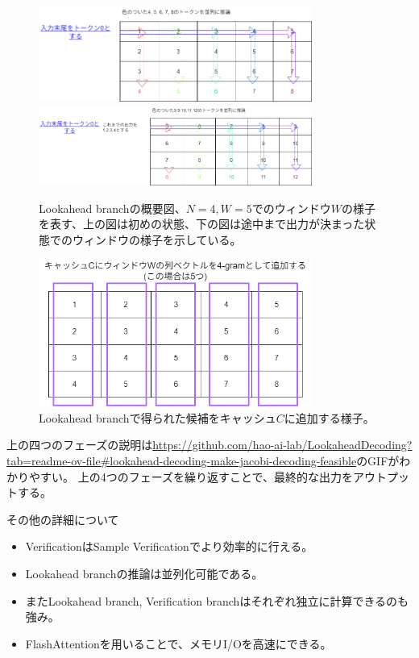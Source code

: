 \documentclass[uplatex]{jsarticle}
\theoremstyle{remark}
\begin{document}
\begin{figure}
  \centering
  \includegraphics[width=0.8\textwidth]{img/lookahead_decoding/lookahead_branch.drawio.png}
  \includegraphics[width=0.8\textwidth]{img/lookahead_decoding/lookahead_branch2.drawio.png}
  \caption{Lookahead branchの概要図、$N = 4, W = 5$でのウィンドウ$W$の様子を表す、上の図は初めの状態、下の図は途中まで出力が決まった状態でのウィンドウの様子を示している。}
  \label{fig:lookahead_branch}
\end{figure}

\begin{figure}
  \centering
  \includegraphics[width=0.8\textwidth]{img/lookahead_decoding/insert_cache.drawio.png}
  \caption{Lookahead branchで得られた候補をキャッシュ$C$に追加する様子。}
  \label{fig:insert_cache}
\end{figure}

上の四つのフェーズの説明は\url{https://github.com/hao-ai-lab/LookaheadDecoding?tab=readme-ov-file#lookahead-decoding-make-jacobi-decoding-feasible}のGIFがわかりやすい。
上の4つのフェーズを繰り返すことで、最終的な出力をアウトプットする。

その他の詳細について
\begin{itemize}
  \item VerificationはSample Verificationでより効率的に行える。
  \item Lookahead branchの推論は並列化可能である。
  \item またLookahead branch, Verification branchはそれぞれ独立に計算できるのも強み。
  \item FlashAttentionを用いることで、メモリI/Oを高速にできる。
\end{itemize}
\end{document}
